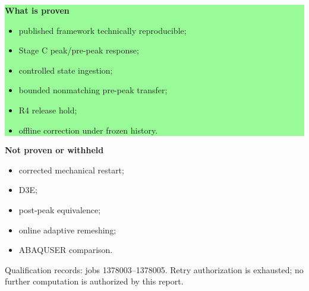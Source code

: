 \documentclass[11pt,a4paper]{article}
\newcommand{\boxx}[2]{\noindent\colorbox{#1}{\parbox{\dimexpr\linewidth-2\fboxsep}{#2}}}
\begin{document}
\begin{minipage}[t]{.48\linewidth}
\boxx{palegreen}{\textbf{\color{green}What is proven}\\
\begin{itemize}
\item published framework technically reproducible;
\item Stage C peak/pre-peak response;
\item controlled state ingestion;
\item bounded nonmatching pre-peak transfer;
\item R4 release hold;
\item offline correction under frozen history.
\end{itemize}}
\end{minipage}\hfill
\begin{minipage}[t]{.48\linewidth}
\boxx{palered}{\textbf{\color{red}Not proven or withheld}\\
\begin{itemize}
\item corrected mechanical restart;
\item D3E;
\item post-peak equivalence;
\item online adaptive remeshing;
\item ABAQUSER comparison.
\end{itemize}}
\end{minipage}
\vfill
\footnotesize Qualification records: jobs 1378003--1378005. Retry authorization is exhausted; no further computation is authorized by this report.
\end{document}
